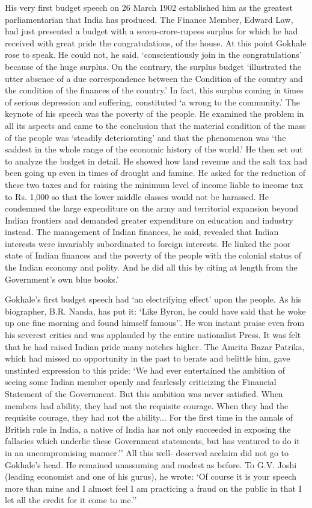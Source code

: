 His very first budget speech on 26 March 1902 established him as the greatest parliamentarian that India has produced. The Finance Member, Edward Law, had just presented a budget with a seven-crore-rupees surplus for which he had received with great pride the congratulations, of the house. At this point Gokhale rose to speak. He could not, he said, `conscientiously join in the congratulations' because of the huge surplus. On the contrary, the surplus budget `illustrated the utter absence of a due correspondence between the Condition of the country and the condition of the finances of the country.' In fact, this surplus coming in times of serious depression and suffering, constituted `a wrong to the community.' The keynote of his speech was the poverty of the people. He examined the problem in all its aspects and came to the conclusion that the material condition of the mass of the people was `steadily deteriorating' and that the phenomenon was `the saddest in the whole range of the economic history of the world.' He then set out to analyze the budget in detail. He showed how land revenue and the salt tax had been going up even in times of drought and famine. He asked for the reduction of these two taxes and for raising the minimum level of income liable to income tax to Rs. 1,000 so that the lower middle classes would not be harassed. He condemned the large expenditure on the army and territorial expansion beyond Indian frontiers and demanded greater expenditure on education and industry instead. The management of Indian finances, he said, revealed that Indian interests were invariably subordinated to foreign interests. He linked the poor state of Indian finances and the poverty of the people with the colonial status of the Indian economy and polity. And he did all this by citing at length from the Government's own blue books.'

Gokhale's first budget speech had `an electrifying effect' upon the people. As his biographer, B.R. Nanda, has put it: `Like Byron, he could have said that he woke up one fine morning and found himself famous''. He won instant praise even from his severest critics and was applauded by the entire nationalist Press. It was felt that he had raised Indian pride many notches higher. The Amrita Bazar Patrika, which had missed no opportunity in the past to berate and belittle him, gave unstinted expression to this pride: `We had ever entertained the ambition of seeing some Indian member openly and fearlessly criticizing the Financial Statement of the Government. But this ambition was never satisfied. When members had ability, they had not the requisite courage. When they had the requisite courage, they had not the ability... For the first time in the annals of British rule in India, a native of India has not only succeeded in exposing the fallacies which underlie these Government statements, but has ventured to do it in an uncompromising manner.'' All this well- deserved acclaim did not go to Gokhale's head. He remained unassuming and modest as before. To G.V. Joshi (leading economist and one of his gurus), he wrote: `Of course it is your speech more than mine and I almost feel I am practicing a fraud on the public in that I let all the credit for it come to me.''

